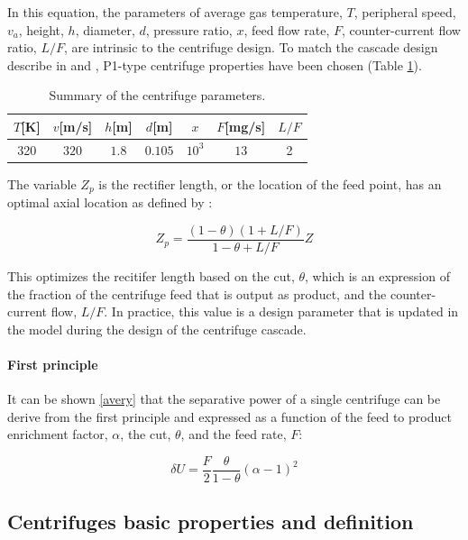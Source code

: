 In this equation, the parameters of average gas temperature, $T$, peripheral speed,
$v_a$, height, $h$, diameter, $d$, pressure ratio, $x$, feed flow rate, $F$,
counter-current flow ratio, $L/F$, are intrinsic to the centrifuge design.
To match the cascade design describe in \cite{glaser.2008} and \cite{walker.2017},
P1-type centrifuge properties have been chosen (Table \ref{tab:centrifuges}).

\begin{table}[htb]
    \centering
    \caption{Summary of the centrifuge parameters.}
    \begin{tabular}{ccccccc}
        \toprule
        $T$[K] & $v$[m/s] & $h$[m] & $d$[m]   & $x$      & $F$[mg/s]  & $L/F$  \\
        \midrule
        320    & $320$    & $1.8$  & $0.105$  & $10^{3}$ & $13$       & 2   \\
        \bottomrule
    \end{tabular}
    \label{tab:centrifuges}
\end{table}

The variable $Z_p$ is the rectifier length, or the location of the feed point, has
an optimal axial location as defined by \cite{raetz.phd}:

\begin{equation}
    Z_p = \frac{(1-\theta)(1+L/F)}{1-\theta+L/F}Z
\end{equation}

This optimizes the recitifer length based on the cut, $\theta$, which is an expression
of the fraction of the centrifuge feed that is output as product, and the counter-current
flow, $L/F$. In practice, this value is a design parameter that is updated in the model
during the design of the centrifuge cascade.

\paragraph{First principle}

It can be shown \ref{avery} that the separative power of a single centrifuge can be
derive from the first principle and expressed as a function of the feed to
product enrichment factor, $\alpha$, the cut, $\theta$, and the feed rate, $F$:

\begin{equation} \label{eq_alpha_principle}
    \delta U = \frac{F}{2}\frac{\theta}{1-\theta}(\alpha-1)^{2}
\end{equation}

\subsection{Centrifuges basic properties and definition}

